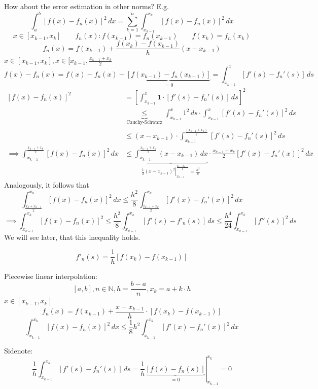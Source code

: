 \documentclass{article}
\begin{document}
How about the error estimation in other norms? E.g.
\[
  \int_a^b \left[f(x) - f_n(x)\right]^2 \, dx
  = \sum_{k=1}^n \int_{x_{k-1}}^{x_k} \left[f(x) - f_n(x)\right]^2 \, dx
\] \[
  x \in [x_{k-1}, x_k] \qquad f_n(x):
  f(x_{k-1}) = f_n(x_{k-1}) \qquad f(x_k) = f_n(x_k)
\] \[
  f_n(x) = f(x_{k - 1}) + \frac{f(x_k) - f(x_{k-1})}{h} (x - x_{k - 1})
\]
$x \in [x_{k-1}, x_k], x \in [x_{k-1}, \frac{x_{k-1} + x_k}{2}$
\[
  f(x) - f_n(x) = f(x) - f_n(x) - \underbrace{\left[f(x_{k-1}) - f_n(x_{k-1})\right]}_{=0}
  = \int_{x_{k-1}}^x \left[f'(s) - f_n'(s)\right] \, ds
\] \begin{align*}
  \left[f(x) - f_n(x)\right]^2
    &= \left[\int_{x_{k-1}}^x \mathbf 1 \cdot \left[f'(s) - f_n'(s)\right] \, ds\right]^2 \\
    &\underbrace{\leq}_{\text{Cauchy-Schwarz}} \int_{x_{k-1}}^x 1^2 \, ds \cdot \int_{x_{k-1}}^x \left[f'(s) - f_n'(s)\right]^2 \, ds \\
    &\leq (x - x_{k-1}) \cdot \int_{x_{k-1}}^{\frac{(x_{k-1} + x_k)}{2}} \left[f'(s) - f_n'(s)\right]^2 \, ds \\
  \implies \int_{x_{k-1}}^{\frac{x_{k-1} + x_k}{2}} \left[f(x) - f_n(x)\right]^2 \, dx
    &\leq \underbrace{\int_{x_{k-1}}^{\frac{x_{k-1} + x_k}{2}} (x - x_{k-1}) \, dx}_{\left.\frac12 (x - x_{k-1})^2 \right|_{x_{k-1}}^{\frac{x_k - x_{k-1}}{2}} = \frac{h^2}{8}} \cdot {\frac{x_{k-1} + x_k}{2}} \left[f'(x) - f_n'(x)\right]^2 \, dx
\end{align*}
Analogously, it follows that
\[ \int_{\frac{x_k + x_{k-1}}{2}}^{x_k} \left[f(x) - f_n(x)\right]^2 \, dx \leq \frac{h^2}{8} \int_{\frac{x_{k-1} + x_k}{2}}^{x_k} \left[f'(x) - f_n'(x)\right]^2 \, dx \]
\[ \implies \int_{x_{k - 1}}^{x_k} \left[f(x) - f_n(x)\right]^2 \leq \frac{h^2}{8} \int_{x_{k-1}}^{x_k} \left[f'(s) - f'_n(s)\right] \, ds \leq \frac{h^4}{24} \int_{x_{k-1}}^{x_k} \left[f''(s)\right]^2 \, ds \]
We will see later, that this inequality holds.

\[ f'_n(s) = \frac1h \left[f(x_k) - f(x_{k-1})\right] \]

Piecewise linear interpolation:
\[ [a,b], n \in \mathbb N, h = \frac{b - a}{n}, x_k = a + k \cdot h \]
$x \in [x_{k-1}, x_k]$
\[ f_n(x) = f(x_{k-1}) + \frac{x - x_{k-1}}{h} \cdot \left[f(x_k) - f(x_{k-1})\right] \]
\[
  \int_{x_{k-1}}^{x_k} \left[f(x) - f_n(x)\right]^2 \, dx
  \leq \frac18 h^2 \int_{x_{k-1}}^{x_k} \left[f'(x) - f_n'(x)\right]^2 \, dx
\]

Sidenote:
\[
  \frac1h \int_{x_{k-1}}^{x_k} \left[f'(s) - f_n'(s)\right] \, ds
  = \left.\frac1h \underbrace{\left[f(s) - f_n(s)\right]}_{=0}\right|_{x_{k-1}}^{x_k} = 0
\]
\end{document}
